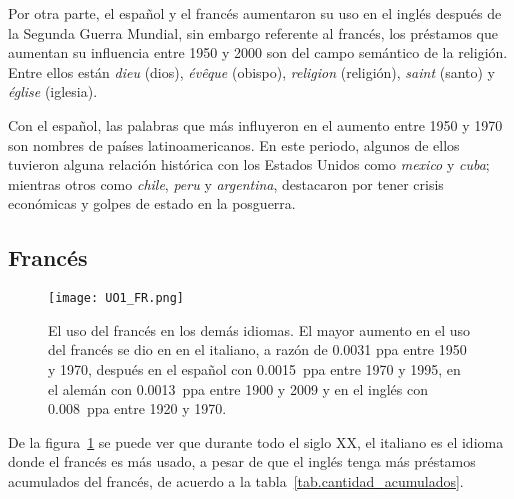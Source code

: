 Por otra parte, el español y el francés aumentaron su uso en el inglés después de la Segunda Guerra Mundial, sin embargo  referente al francés, los préstamos que aumentan su influencia entre 1950 y 2000 son del campo semántico de la religión. Entre ellos están \textit{dieu} (dios), \textit{évêque} (obispo), \textit{religion} (religión), \textit{saint} (santo) y \textit{église} (iglesia).

Con el español, las palabras que más influyeron en el aumento entre 1950 y 1970 son nombres de países latinoamericanos. En este periodo, algunos de ellos tuvieron alguna relación histórica con los Estados Unidos como \textit{mexico} y \textit{cuba}; mientras otros como \textit{chile}, \textit{peru} y \textit{argentina}, destacaron por tener crisis económicas y golpes de estado en la posguerra.  
\label{D-EN}


 



\subsection{Francés} %

\begin{figure}[h!]
	\centering
	\texttt{[image: UO1\_FR.png]}
	\caption{El uso del francés en los demás idiomas. El mayor aumento en el uso del francés se dio en en el italiano, a razón de 0.0031 ppa entre 1950 y 1970, después en el español con 0.0015~ppa entre 1970 y 1995, en el alemán con 0.0013~ppa entre 1900 y 2009 y en el inglés con 0.008~ppa entre 1920 y 1970.}
	\label{fig.UO_FR}
\end{figure}

De la figura~\ref{fig.UO_FR} se puede ver que durante todo el siglo XX, el italiano es el idioma donde el francés es más usado, a pesar de que el inglés tenga más préstamos acumulados del francés, de acuerdo a la tabla~\ref{tab.cantidad_acumulados}. 


